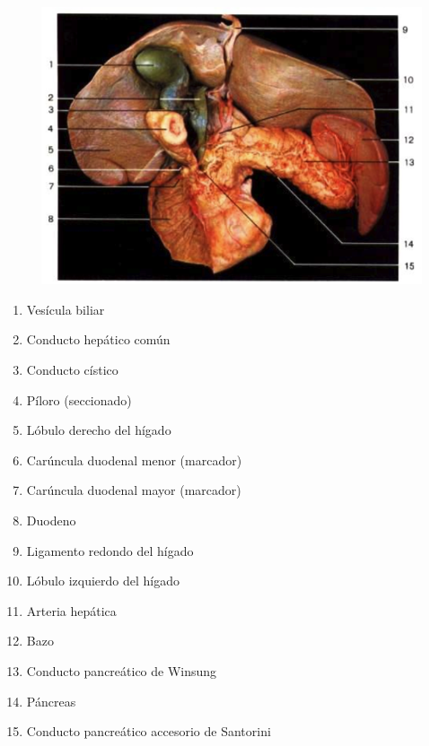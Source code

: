 \begin{figure}[H]
	\begin{center}
 		\includegraphics[width = 1\textwidth]{v2/images/image20.png}
	\end{center} 
\end{figure}
\begin{enumerate}
    \item Vesícula biliar
    \item Conducto hepático común
    \item Conducto cístico
    \item Píloro (seccionado)
    \item Lóbulo derecho del hígado
    \item Carúncula duodenal menor (marcador)
    \item Carúncula duodenal mayor (marcador)
    \item Duodeno
    \item Ligamento redondo del hígado
    \item Lóbulo izquierdo del hígado
    \item Arteria hepática
    \item Bazo
    \item Conducto pancreático de Winsung
    \item Páncreas
    \item Conducto pancreático accesorio de Santorini    
\end{enumerate}
